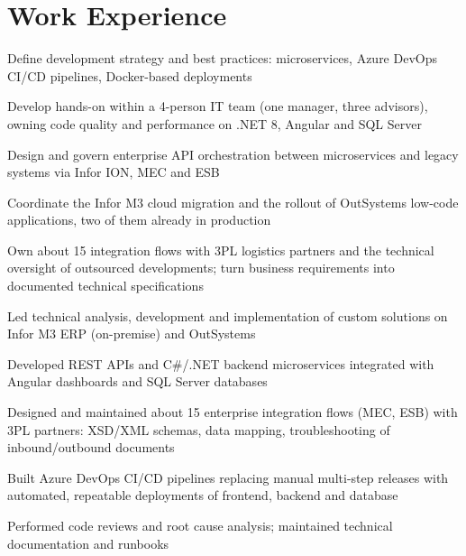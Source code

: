 \documentclass[a4paper,10pt]{article}
\begin{document}
\section{Work Experience}

\begin{cvitems}
  \item Define development strategy and best practices: microservices, Azure DevOps CI/CD pipelines, Docker-based deployments
  \item Develop hands-on within a 4-person IT team (one manager, three advisors), owning code quality and performance on .NET 8, Angular and SQL Server
  \item Design and govern enterprise API orchestration between microservices and legacy systems via Infor ION, MEC and ESB
  \item Coordinate the Infor M3 cloud migration and the rollout of OutSystems low-code applications, two of them already in production
  \item Own about 15 integration flows with 3PL logistics partners and the technical oversight of outsourced developments; turn business requirements into documented technical specifications
\end{cvitems}

\begin{cvitems}
  \item Led technical analysis, development and implementation of custom solutions on Infor M3 ERP (on-premise) and OutSystems
  \item Developed REST APIs and C\#/.NET backend microservices integrated with Angular dashboards and SQL Server databases
  \item Designed and maintained about 15 enterprise integration flows (MEC, ESB) with 3PL partners: XSD/XML schemas, data mapping, troubleshooting of inbound/outbound documents
  \item Built Azure DevOps CI/CD pipelines replacing manual multi-step releases with automated, repeatable deployments of frontend, backend and database
  \item Performed code reviews and root cause analysis; maintained technical documentation and runbooks
\end{cvitems}
\end{document}
